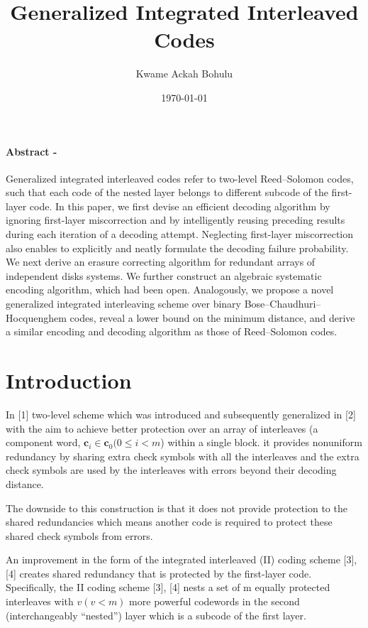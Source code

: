 \documentclass[fontsize=12pt]{article}
\title{Generalized Integrated Interleaved Codes}
\author{Kwame Ackah Bohulu}
\date{\today}
\begin{document}
\maketitle

\newpage
\paragraph{Abstract -}
Generalized integrated interleaved codes refer to
two-level Reed–Solomon codes, such that each code of the nested
layer belongs to different subcode of the first-layer code. In this
paper, we first devise an efficient decoding algorithm by ignoring
first-layer miscorrection and by intelligently reusing preceding
results during each iteration of a decoding attempt. Neglecting
first-layer miscorrection also enables to explicitly and neatly
formulate the decoding failure probability. We next derive an
erasure correcting algorithm for redundant arrays of independent
disks systems. We further construct an algebraic systematic
encoding algorithm, which had been open. Analogously, we
propose a novel generalized integrated interleaving scheme over
binary Bose–Chaudhuri–Hocquenghem codes, reveal a lower
bound on the minimum distance, and derive a similar encoding
and decoding algorithm as those of Reed–Solomon codes.

\section{Introduction}


In [1]  two-level scheme which was introduced
and subsequently generalized in [2] with the aim to achieve better protection over an array of interleaves (a component word, $\mathbf{c}_i \in \mathbf{c}_0 (0 \leq i < m$) within a single block. it provides
nonuniform redundancy by sharing extra check symbols with all the interleaves and the extra check symbols are used by the interleaves with
errors beyond their decoding distance. 

The downside to this construction is that it
does not provide protection to the shared redundancies which means another code is required to protect these shared check
symbols from errors. 

An improvement in the form of the integrated interleaved (II) coding
scheme [3], [4]  creates shared
redundancy that is protected by the first-layer code. Specifically,
the II coding scheme [3], [4] nests a set of m equally
protected interleaves with $v (v<m)$ more powerful codewords
in the second (interchangeably ``nested'') layer which is a
subcode of the first layer. 
\end{document}
